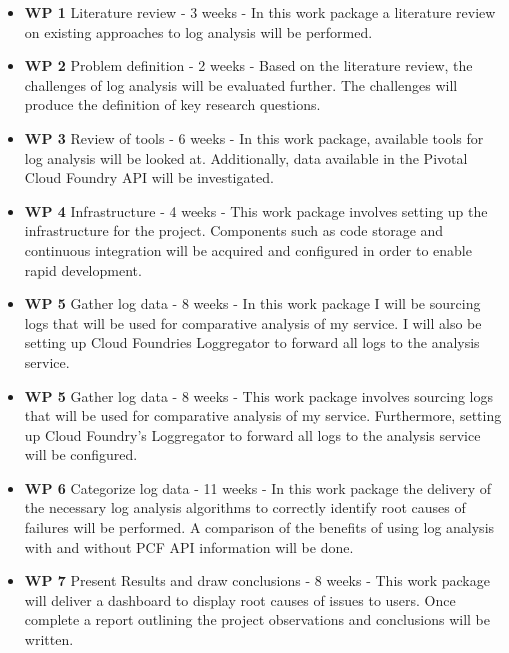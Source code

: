 \begin{itemize}
  \item \textbf{WP 1} Literature review - 3 weeks - In this work package a literature review on existing approaches to log analysis will be performed.
  
  \item \textbf{WP 2} Problem definition - 2 weeks - Based on the literature review, the challenges of log analysis will be evaluated further. The challenges will produce the definition of key research questions.
  
  \item \textbf{WP 3} Review of tools - 6 weeks - In this work package, available tools for log analysis will be looked at. Additionally, data available in the Pivotal Cloud Foundry API will be investigated.
  
\item \textbf{WP 4} Infrastructure - 4 weeks - This work package involves setting up the infrastructure for the project. Components such as code storage and continuous integration will be acquired and configured in order to enable rapid development. 
  
  \item \textbf{WP 5} Gather log data - 8 weeks - In this work package I will be sourcing logs that will be used for comparative analysis of my service. I will also be setting up Cloud Foundries Loggregator to forward all logs to the analysis service.
  
  \item \textbf{WP 5} Gather log data - 8 weeks - This work package involves sourcing logs that will be used for comparative analysis of my service. Furthermore, setting up Cloud Foundry's Loggregator to forward all logs to the analysis service will be configured.
  
  \item \textbf{WP 6} Categorize log data - 11 weeks - In this work package the delivery of the necessary log analysis algorithms to correctly identify root causes of failures will be performed. A comparison of the benefits of using log analysis with and without PCF API information will be done.
    
  \item \textbf{WP 7} Present Results and draw conclusions - 8 weeks - This work package will deliver a dashboard to display root causes of issues to users. Once complete a report outlining the project observations and conclusions will be written.
\end{itemize}

